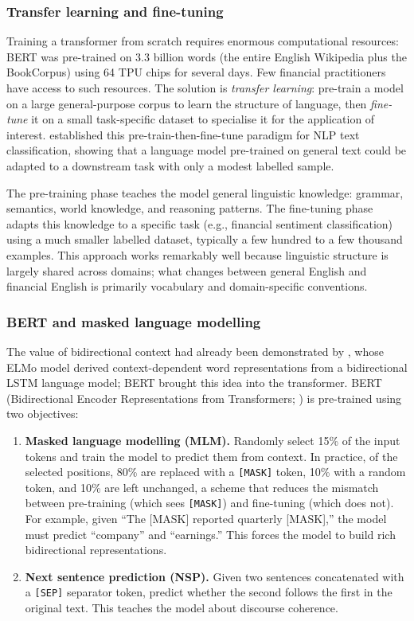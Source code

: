 \subsubsection{Transfer learning and fine-tuning}

Training a transformer from scratch requires enormous computational resources: BERT was pre-trained on 3.3 billion words (the entire English Wikipedia plus the BookCorpus) using 64 TPU chips for several days. Few financial practitioners have access to such resources. The solution is \textit{transfer learning}: pre-train a model on a large general-purpose corpus to learn the structure of language, then \textit{fine-tune} it on a small task-specific dataset to specialise it for the application of interest. \cite{howard2018ulmfit} established this pre-train-then-fine-tune paradigm for NLP text classification, showing that a language model pre-trained on general text could be adapted to a downstream task with only a modest labelled sample.

The pre-training phase teaches the model general linguistic knowledge: grammar, semantics, world knowledge, and reasoning patterns. The fine-tuning phase adapts this knowledge to a specific task (e.g., financial sentiment classification) using a much smaller labelled dataset, typically a few hundred to a few thousand examples. This approach works remarkably well because linguistic structure is largely shared across domains; what changes between general English and financial English is primarily vocabulary and domain-specific conventions.

\subsubsection{BERT and masked language modelling}

The value of bidirectional context had already been demonstrated by \cite{peters2018elmo}, whose ELMo model derived context-dependent word representations from a bidirectional LSTM language model; BERT brought this idea into the transformer. BERT (Bidirectional Encoder Representations from Transformers; \citep{devlin2019bert}) is pre-trained using two objectives:

\begin{enumerate}
\item \textbf{Masked language modelling (MLM).} Randomly select 15\% of the input tokens and train the model to predict them from context. In practice, of the selected positions, 80\% are replaced with a \texttt{[MASK]} token, 10\% with a random token, and 10\% are left unchanged, a scheme that reduces the mismatch between pre-training (which sees \texttt{[MASK]}) and fine-tuning (which does not). For example, given ``The [MASK] reported quarterly [MASK],'' the model must predict ``company'' and ``earnings.'' This forces the model to build rich bidirectional representations.
\item \textbf{Next sentence prediction (NSP).} Given two sentences concatenated with a \texttt{[SEP]} separator token, predict whether the second follows the first in the original text. This teaches the model about discourse coherence.
\end{enumerate}

